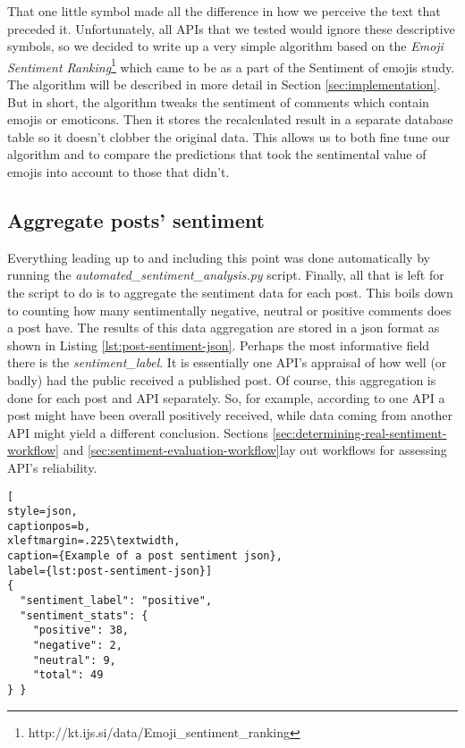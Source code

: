 That one little symbol made all the difference in how we perceive the text that preceded it. 
Unfortunately, all APIs that we tested would ignore these descriptive symbols, so we decided to write up a very simple algorithm based on the \emph{Emoji Sentiment Ranking}\footnote{http://kt.ijs.si/data/Emoji\_sentiment\_ranking} which came to be as a part of the Sentiment of emojis study\cite{Kralj2015emojis}.  
The algorithm will be described in more detail in Section \ref{sec:implementation}.
But in short, the algorithm tweaks the sentiment of comments which contain emojis or emoticons. 
Then it stores the recalculated result in a separate database table so it doesn't clobber the original data. 
This allows us to both fine tune our algorithm and to compare the predictions that took the sentimental value of emojis into account to those that didn't.

\subsection*{Aggregate posts' sentiment \label{sec:aggregate-post-sentiment}}
Everything leading up to and including this point was done automatically by running the \textit{automated\_sentiment\_analysis.py} script.
Finally, all that is left for the script to do is to aggregate the sentiment data for each post. 
This boils down to counting how many sentimentally negative, neutral or positive comments does a post have. 
The results of this data aggregation are stored in a json format as shown in Listing \ref{lst:post-sentiment-json}. 
Perhaps the most informative field there is the \emph{sentiment\_label}. It is essentially one API's appraisal of how well (or badly) had the public received a published post.
Of course, this aggregation is done for each post and API separately. So, for example, according to one API a post might have been overall positively received, while data coming from another API might yield a different conclusion. Sections \ref{sec:determining-real-sentiment-workflow} and \ref{sec:sentiment-evaluation-workflow}lay out workflows for assessing API's reliability.
\begin{lstlisting}[
style=json,
captionpos=b,
xleftmargin=.225\textwidth,
caption={Example of a post sentiment json},
label={lst:post-sentiment-json}]
{ 
  "sentiment_label": "positive", 
  "sentiment_stats": {
    "positive": 38, 
    "negative": 2,
    "neutral": 9, 
    "total": 49 
} }
\end{lstlisting}

